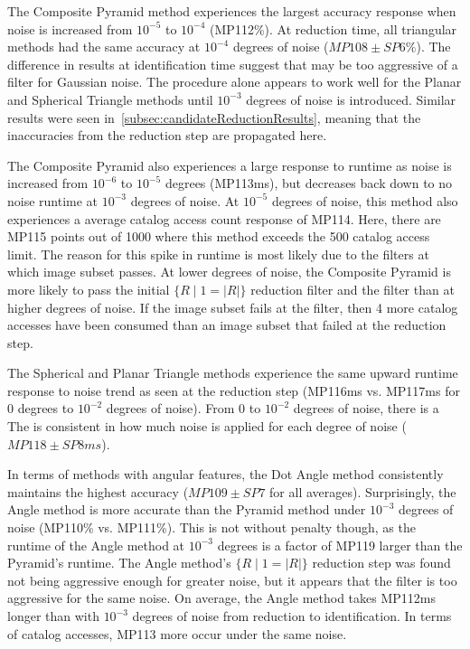 The Composite Pyramid method experiences the largest accuracy response when noise is increased from $10^{-5}$ to
$10^{-4}$ (MP112\%).
At reduction time, all triangular methods had the same accuracy at $10^{-4}$ degrees of noise ($MP108 \pm SP6\%$).
The difference in results at identification time suggest that  may be too aggressive of a filter for
Gaussian noise.
The  procedure alone appears to work well for the Planar and Spherical Triangle methods until $10^{-3}$
degrees of noise is introduced.
Similar results were seen in~\autoref{subsec:candidateReductionResults}, meaning that the inaccuracies from the
reduction step are propagated here.

The Composite Pyramid also experiences a large response to runtime as noise is increased from $10^{-6}$ to $10^{-5}$
degrees (MP113ms), but decreases back down to no noise runtime at $10^{-3}$ degrees of noise.
At $10^{-5}$ degrees of noise, this method also experiences a average catalog access count response of MP114.
Here, there are MP115 points out of 1000 where this method exceeds the 500 catalog access limit.
The reason for this spike in runtime is most likely due to the filters at which image subset passes.
At lower degrees of noise, the Composite Pyramid is more likely to pass the initial $\{ R \mid 1 = |R| \}$ reduction filter
and the  filter than at higher degrees of noise.
If the image subset fails at the  filter, then 4 more catalog accesses have been consumed than an image
subset that failed at the reduction step.

The Spherical and Planar Triangle methods experience the same upward runtime response to noise trend as seen at the
reduction step (MP116ms vs. MP117ms for 0 degrees to $10^{-2}$ degrees of noise).
From 0 to $10^{-2}$ degrees of noise, there is a
The  is consistent in how much noise is applied for each degree of noise ($MP118 \pm SP8ms$).

In terms of methods with angular features, the Dot Angle method consistently maintains the highest accuracy
($MP109 \pm SP7$ for all averages).
Surprisingly, the Angle method is more accurate than the Pyramid method under $10^{-3}$ degrees
of noise (MP110\% vs. MP111\%).
This is not without penalty though, as the runtime of the Angle method at $10^{-3}$ degrees is a factor of
MP119 larger than the Pyramid's runtime.
The Angle method's $\{ R \mid 1 = |R| \}$ reduction step was found not being aggressive enough for greater noise,
but it appears that the  filter is too aggressive for the same noise.
On average, the Angle method takes MP112ms longer than with $10^{-3}$ degrees of noise from reduction to
identification.
In terms of catalog accesses, MP113 more occur under the same noise.

